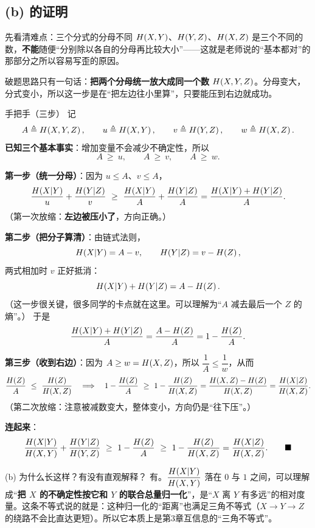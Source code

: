 \documentclass[11pt,a4paper]{ctexart}
\begin{document}
\subsection{(b) 的证明}

\begin{idea}{先看清难点：三个分式的分母不同}
$H\!\left(X,Y\right)$、$H\!\left(Y,Z\right)$、$H\!\left(X,Z\right)$ 是三个不同的数，\textbf{不能}随便“分别除以各自的分母再比较大小”——这就是老师说的“基本都对”的那部分之所以容易写歪的原因。

破题思路只有一句话：\textbf{把两个分母统一放大成同一个数 $H\!\left(X,Y,Z\right)$}。分母变大，分式变小，所以这一步是在“把左边往小里算”，只要能压到右边就成功。
\end{idea}

\begin{calc}{手把手（三步）}
记
\[
A\triangleq H\!\left(X,Y,Z\right),\qquad u\triangleq H\!\left(X,Y\right),\qquad v\triangleq H\!\left(Y,Z\right),\qquad w\triangleq H\!\left(X,Z\right).
\]
\textbf{已知三个基本事实}：增加变量不会减少不确定性，所以
\[
A\ \ge\ u,\qquad A\ \ge\ v,\qquad A\ \ge\ w .
\]

\textbf{第一步（统一分母）}：因为 $u\le A$、$v\le A$，
\[
\frac{H\!\left(X|Y\right)}{u}+\frac{H\!\left(Y|Z\right)}{v}
\ \ge\ \frac{H\!\left(X|Y\right)}{A}+\frac{H\!\left(Y|Z\right)}{A}
=\frac{H\!\left(X|Y\right)+H\!\left(Y|Z\right)}{A}.
\]
（第一次放缩：\textbf{左边被压小了}，方向正确。）

\textbf{第二步（把分子算清）}：由链式法则，
\[
H\!\left(X|Y\right)=A-v,\qquad H\!\left(Y|Z\right)=v-H\!\left(Z\right),
\]
两式相加时 $v$ 正好抵消：
\[
H\!\left(X|Y\right)+H\!\left(Y|Z\right)=A-H\!\left(Z\right).
\]
（这一步很关键，很多同学的卡点就在这里。可以理解为“$A$ 减去最后一个 $Z$ 的熵”。）
于是
\[
\frac{H\!\left(X|Y\right)+H\!\left(Y|Z\right)}{A}=\frac{A-H\!\left(Z\right)}{A}=1-\frac{H\!\left(Z\right)}{A}.
\]

\textbf{第三步（收到右边）}：因为 $A\ge w=H\!\left(X,Z\right)$，所以 $\dfrac{1}{A}\le\dfrac{1}{w}$，从而
\[
\frac{\Hx{Z}}{A}\ \le\ \frac{\Hx{Z}}{\Hx{X,Z}}
\quad\Longrightarrow\quad
1-\frac{\Hx{Z}}{A}\ \ge\ 1-\frac{\Hx{Z}}{\Hx{X,Z}}
=\frac{\Hx{X,Z}-\Hx{Z}}{\Hx{X,Z}}
=\frac{\Hx{X|Z}}{\Hx{X,Z}}.
\]
（第二次放缩：注意被减数变大，整体变小，方向仍是“往下压”。）

\textbf{连起来}：
\[
\frac{\Hx{X|Y}}{\Hx{X,Y}}+\frac{\Hx{Y|Z}}{\Hx{Y,Z}}
\ \ge\ 1-\frac{\Hx{Z}}{A}
\ \ge\ 1-\frac{\Hx{Z}}{\Hx{X,Z}}
=\frac{\Hx{X|Z}}{\Hx{X,Z}}.\qquad\blacksquare
\]
\end{calc}

\begin{qa}{(b) 为什么长这样？有没有直观解释？}
有。$\dfrac{H\!\left(X|Y\right)}{H\!\left(X,Y\right)}$ 落在 $0$ 与 $1$ 之间，可以理解成“\textbf{把 $X$ 的不确定性按它和 $Y$ 的联合总量归一化}”，是“$X$ 离 $Y$ 有多远”的相对度量。这条不等式说的就是：这种归一化的“距离”也满足三角不等式（$X\to Y\to Z$ 的绕路不会比直达更短）。所以它本质上是第3章互信息的“三角不等式”。
\end{qa}
\end{document}
